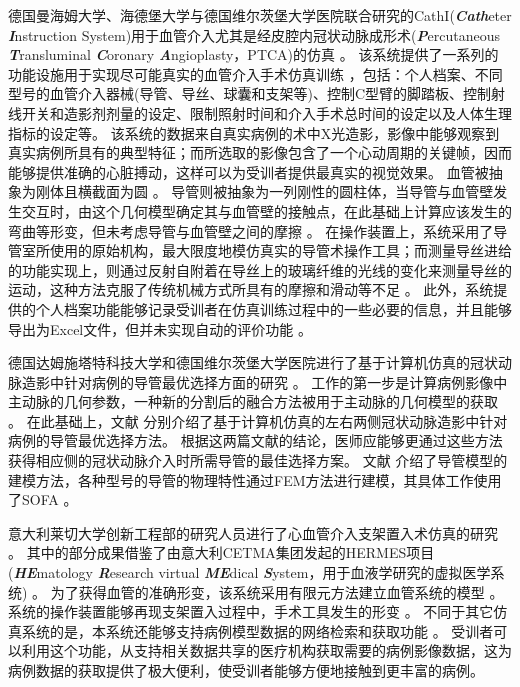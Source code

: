 德国曼海姆大学、海德堡大学与德国维尔茨堡大学医院联合研究的CathI(\textbf{\textit{Cath}}eter \textbf{\textit{I}}nstruction System)用于血管介入尤其是经皮腔内冠状动脉成形术(\textbf{\textit{P}}ercutaneous \textbf{\textit{T}}ransluminal \textbf{\textit{C}}oronary \textbf{\textit{A}}ngioplasty，PTCA)的仿真 \cite{rebholz2004cathi,Hoefer2002CathI}。%
该系统提供了一系列的功能设施用于实现尽可能真实的血管介入手术仿真训练 \cite{rebholz2004cathi}，包括：个人档案、不同型号的血管介入器械(导管、导丝、球囊和支架等)、控制C型臂的脚踏板、控制射线开关和造影剂剂量的设定、限制照射时间和介入手术总时间的设定以及人体生理指标的设定等。%
该系统的数据来自真实病例的术中X光造影，影像中能够观察到真实病例所具有的典型特征；而所选取的影像包含了一个心动周期的关键帧，因而能够提供准确的心脏搏动，这样可以为受训者提供最真实的视觉效果。
血管被抽象为刚体且横截面为圆 \cite{Hoefer2002CathI}。%
导管则被抽象为一列刚性的圆柱体，当导管与血管壁发生交互时，由这个几何模型确定其与血管壁的接触点，在此基础上计算应该发生的弯曲等形变，但未考虑导管与血管壁之间的摩擦 \cite{rebholz2004cathi}。%
在操作装置上，系统采用了导管室所使用的原始机构，最大限度地模仿真实的导管术操作工具；而测量导丝进给的功能实现上，则通过反射自附着在导丝上的玻璃纤维的光线的变化来测量导丝的运动，这种方法克服了传统机械方式所具有的摩擦和滑动等不足 \cite{Hoefer2002CathI}。%
此外，系统提供的个人档案功能能够记录受训者在仿真训练过程中的一些必要的信息，并且能够导出为Excel文件，但并未实现自动的评价功能 \cite{rebholz2004cathi}。

德国达姆施塔特科技大学和德国维尔茨堡大学医院进行了基于计算机仿真的冠状动脉造影中针对病例的导管最优选择方面的研究 \cite{Rahman2012Darmstadt,Rahman2011bDarmstadt,Rahman2011aDarmstadt,Flehmann2011Darmstadt}。%
工作的第一步是计算病例影像中主动脉的几何参数，一种新的分割后的融合方法被用于主动脉的几何模型的获取 \cite{Flehmann2011Darmstadt}。
在此基础上，文献 \cite{Rahman2011bDarmstadt,Rahman2011aDarmstadt}分别介绍了基于计算机仿真的左右两侧冠状动脉造影中针对病例的导管最优选择方法。
根据这两篇文献的结论，医师应能够更通过这些方法获得相应侧的冠状动脉介入时所需导管的最佳选择方案。
文献 \cite{Rahman2012Darmstadt}介绍了导管模型的建模方法，各种型号的导管的物理特性通过FEM方法进行建模，其具体工作使用了SOFA \cite{Allard2007SOFA}。

意大利莱切大学创新工程部的研究人员进行了心血管介入支架置入术仿真的研究 \cite{aloisio2006HERMES,aloisio2006aHERMES,aloisio2005HERMES,aloisio2004HERMES}。
其中的部分成果借鉴了由意大利CETMA集团发起的HERMES项目(\textbf{\textit{HE}}matology \textbf{\textit{R}}esearch virtual \textbf{\textit{ME}}dical \textbf{\textit{S}}ystem，用于血液学研究的虚拟医学系统) \cite{aloisio2005HERMES}。%
为了获得血管的准确形变，该系统采用有限元方法建立血管系统的模型 \cite{aloisio2004HERMES}。
系统的操作装置能够再现支架置入过程中，手术工具发生的形变 \cite{aloisio2005HERMES}。
不同于其它仿真系统的是，本系统还能够支持病例模型数据的网络检索和获取功能 \cite{aloisio2006aHERMES,aloisio2006HERMES}。
受训者可以利用这个功能，从支持相关数据共享的医疗机构获取需要的病例影像数据，这为病例数据的获取提供了极大便利，使受训者能够方便地接触到更丰富的病例。

